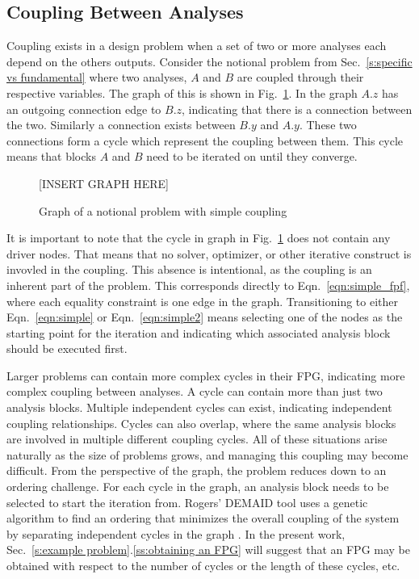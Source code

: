 \subsection{Coupling Between Analyses}
	\label{ss:coupling}
	Coupling exists in a design problem when a set of two or more analyses each depend on the
	others outputs. Consider the notional problem from Sec.~\ref{s:specific vs fundamental} where two 
	analyses, $A$ and $B$ are coupled through their respective variables. The graph of this 
	is shown in Fig.~\ref{f:coupling}. In the graph $A.z$ has an outgoing connection 
	edge to $B.z$, indicating that there is a connection between the two. 
	Similarly a connection exists between $B.y$ and $A.y$. These two connections form 
	a cycle which represent the coupling between them. This cycle means that blocks $A$ and $B$ need
	to be iterated on until they converge. 
	\begin{figure}
	  \begin{center}
	  [INSERT GRAPH HERE]
	  \caption{Graph of a notional problem with simple coupling \label{f:coupling}}
	  \end{center}
	\end{figure}

	It is important to note that the cycle in graph in Fig.~\ref{f:coupling} does not contain 
	any driver nodes. That means that no solver, optimizer, or other iterative construct is 
	invovled in the coupling. This absence is intentional, as the coupling is an inherent part 
	of the problem. This corresponds directly to Eqn.~\ref{eqn:simple_fpf}, where 
	each equality constraint is one edge in the graph. Transitioning to either 
	Eqn.~\ref{eqn:simple} or Eqn.~\ref{eqn:simple2} means selecting one of the nodes as the starting point 
	for the iteration and indicating which associated analysis block should be executed first. 

	Larger problems can contain more complex cycles in their FPG, indicating more 
	complex coupling between analyses. A cycle can contain more than 
	just two analysis blocks. Multiple independent cycles can exist, indicating 
	independent coupling relationships. Cycles can also overlap, where the same analysis 
	blocks are involved in multiple different coupling cycles. All of these situations
	arise naturally as the size of problems grows, and managing this coupling may
	become difficult. From the perspective of the graph, the problem reduces down to 
	an ordering challenge. For each cycle in the graph, an analysis block needs to be selected 
	to start the iteration from. Rogers' DEMAID tool uses a genetic algorithm to find an ordering 
	that minimizes the overall coupling of the system by separating independent 
	cycles in the graph \cite{rogers1996,rogers1996demaid}. In the present work, Sec.~\ref{s:example problem}.\ref{ss:obtaining an FPG} will suggest that an FPG may be obtained with respect to the number of cycles or the length of these cycles, etc.

